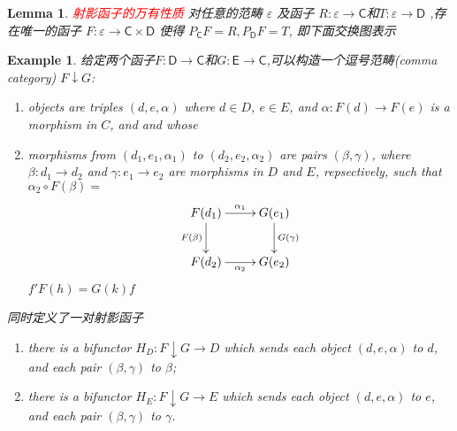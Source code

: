 \documentclass{article}
\newtheorem{lemma}[theorem]{Lemma}
\newtheorem{example}[theorem]{Example}
\newcommand*{\cat}[1]{\textsf{#1}\xspace}
\newcommand{\sC}{\mathsf{C}}
\newcommand{\sD}{\mathsf{D}}
\newcommand{\sE}{\mathsf{E}}
\newcommand*{\xfunc}[4]{{#2}\colon{#3}{#1}{#4}}
\newcommand*{\func}[3]{\xfunc{\to}{#1}{#2}{#3}}
\newcommand{\redt}[1]{\textcolor{red}{#1}}
\begin{document}
\begin{lemma}
\rm \redt{射影函子的万有性质} 对任意的范畴 $\varepsilon$ 及函子 $R\colon \varepsilon \rightarrow \cat{C}$和$T\colon \varepsilon \rightarrow \cat{D}$ ,存在唯一的函子 $F\colon \varepsilon \rightarrow \cat{C}\times\cat{D}$ 使得 $P_{\cat{C}}F=R,P_{\cat{D}}F=T$, 即下面交换图表示
\begin{center}
\end{center}
\end{lemma}


\begin{example}
\rm 给定两个函子$\func{F}{\sD}{\sC}$和$\func{G}{\sE}{\sC}$,可以构造一个逗号范畴(comma category) $F \downarrow G$:
	\begin{enumerate}
		\item objects are triples $(d,e,\alpha)$ where $d \in D$, $e \in E$, and $\alpha: F(d) \to F(e)$ is a morphism in $C$, and and whose
		\item morphisms from $(d_1,e_1,\alpha_1)$ to $(d_2,e_2,\alpha_2)$ are pairs $(\beta,\gamma)$, where $\beta:d_1 \to d_2$ and $\gamma: e_1 \to e_2$ are morphisms in $D$ and $E$, repsectively, such that $\alpha_2 \circ F(\beta) = $
		\[\xymatrix{
					F(d_1) \ar[d]_{F(\beta)} \ar[r]^{\alpha_1} & G(e_1)\ar[d]^{G(\gamma)}  \\
			F(d_2)\ar[r]_{\alpha_2} &G(e_2)}\]
			$f'F(h) = G(k)f$
	\end{enumerate}
	同时定义了一对射影函子
	\begin{enumerate}
		\item there is a bifunctor $H_D:F\downarrow G \to D$ which sends each object $(d,e,\alpha)$ to $d$, and each pair $(\beta,\gamma)$ to $\beta$;
		\item there is a bifunctor $H_E:F\downarrow G \to E$ which sends each object $(d,e,\alpha)$ to $e$, and each pair $(\beta,\gamma)$ to $\gamma$.
	\end{enumerate}
\end{example}
\end{document}
